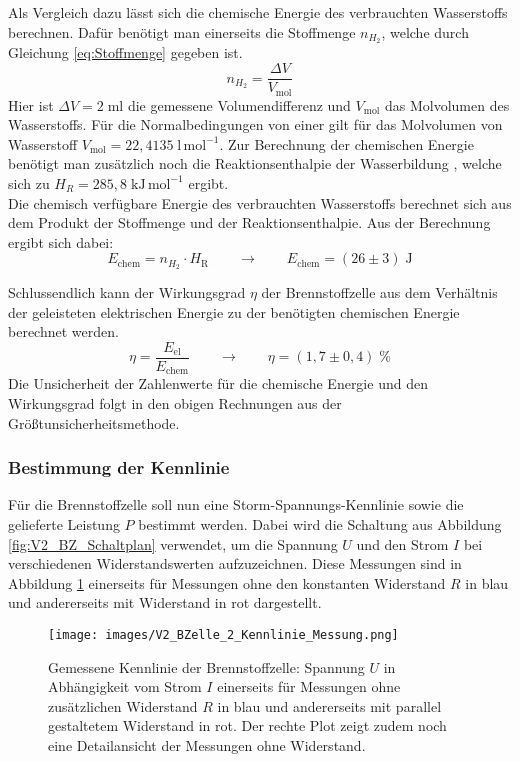 \documentclass{article}
\begin{document}
\noindent Als Vergleich dazu lässt sich die chemische Energie des verbrauchten Wasserstoffs berechnen. Dafür benötigt man einerseits die Stoffmenge $n_{H_2}$, welche durch Gleichung \ref{eq:Stoffmenge} gegeben ist.
\begin{equation}\label{eq:Stoffmenge}
    n_{H_2} = \frac{\Delta V}{V_\text{mol}}
\end{equation}
\noindent Hier ist $\Delta V = 2 \; \text{ml}$ die gemessene Volumendifferenz und $V_\text{mol}$ das Molvolumen des Wasserstoffs. Für die Normalbedingungen von einer \cite{Molvolumen} gilt für das Molvolumen von Wasserstoff $V_\text{mol}= 22{,}4135 \; \text{l}\,\text{mol}^{-1}$. Zur Berechnung der chemischen Energie benötigt man zusätzlich noch die Reaktionsenthalpie der Wasserbildung \cite{NISTWater}, welche sich zu $H_R =  285{,}8\;\text{kJ}\,\text{mol}^{-1}$ ergibt.\\
Die chemisch verfügbare Energie des verbrauchten Wasserstoffs berechnet sich aus dem Produkt der Stoffmenge und der Reaktionsenthalpie. Aus der Berechnung ergibt sich dabei:
$$E_\text{chem} = n_{H_2}\cdot H_\mathrm{R} \qquad \rightarrow \qquad E_\text{chem} = (26 \pm 3) \; \text{J}$$

\noindent Schlussendlich kann der Wirkungsgrad \(\eta\) der Brennstoffzelle aus dem Verhältnis der geleisteten elektrischen Energie zu der benötigten chemischen Energie berechnet werden.
\begin{equation}
    \eta = \frac{E_\text{el}}{E_\text{chem}} \qquad \rightarrow \qquad \eta = (1{,}7 \pm 0{,}4) \; \%
\end{equation}
Die Unsicherheit der Zahlenwerte für die chemische Energie und den Wirkungsgrad folgt in den obigen Rechnungen aus der Größtunsicherheitsmethode.
\subsubsection{Bestimmung der Kennlinie}
\noindent Für die Brennstoffzelle soll nun eine Storm-Spannungs-Kennlinie sowie die gelieferte Leistung $P$ bestimmt werden. Dabei wird die Schaltung aus Abbildung \ref{fig:V2_BZ_Schaltplan} verwendet, um die Spannung $U$ und den Strom $I$ bei verschiedenen Widerstandswerten aufzuzeichnen. Diese Messungen sind in Abbildung \ref{fig:V2_BZ_Kennlinien_Messung} einerseits für Messungen ohne den konstanten Widerstand $R$ in blau und andererseits mit Widerstand in rot dargestellt.
\begin{figure}[H]
    \centering
    \texttt{[image: images/V2\_BZelle\_2\_Kennlinie\_Messung.png]}
    \caption{Gemessene Kennlinie der Brennstoffzelle: Spannung \(U\) in Abhängigkeit vom Strom \(I\) einerseits für Messungen ohne zusätzlichen Widerstand $R$ in blau und andererseits mit parallel gestaltetem Widerstand in rot. Der rechte Plot zeigt zudem noch eine Detailansicht der Messungen ohne Widerstand.}
    \label{fig:V2_BZ_Kennlinien_Messung}
\end{figure}
\end{document}
